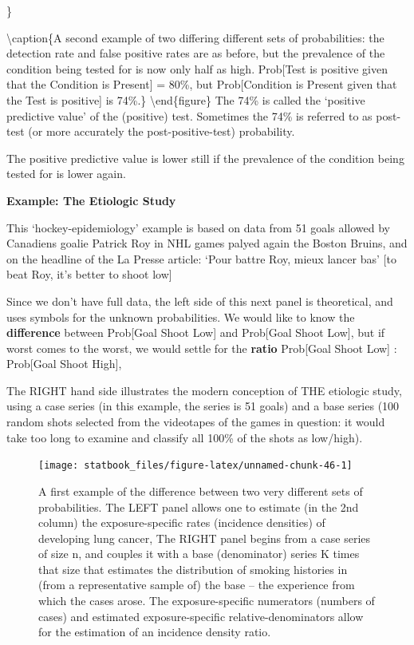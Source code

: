 \documentclass[]{book}
\begin{document}
\}

\textbackslash{}caption\{A second example of two differing different sets of probabilities: the detection rate and false positive rates are as before, but the prevalence of the condition being tested for is now only half as high. Prob{[}Test is positive given that the Condition is Present{]} = 80\%, but Prob{[}Condition is Present given that the Test is positive{]} is 74\%.\}\label{fig:unnamed-chunk-45}
\textbackslash{}end\{figure\}
The 74\% is called the `positive predictive value' of the (positive) test. Sometimes the 74\% is referred to as post-test (or more accurately the post-positive-test) probability.

The positive predictive value is lower still if the
prevalence of the condition being tested for is lower again.

\textbf{Example: The Etiologic Study}

This `hockey-epidemiology' example is based on data from 51 goals allowed by Canadiens goalie Patrick Roy in NHL games palyed again the Boston Bruins, and on the headline of the La Presse article: `Pour battre Roy, mieux lancer bas' {[}to beat Roy, it's better to shoot low{]}

Since we don't have full data, the left side of this next panel is theoretical, and uses symbols for the unknown probabilities. We would like to know the \textbf{difference} between Prob{[}Goal \textbar{} Shoot Low{]} and Prob{[}Goal \textbar{} Shoot Low{]}, but if worst comes to the worst, we would settle for the \textbf{ratio} Prob{[}Goal \textbar{} Shoot Low{]} : Prob{[}Goal \textbar{} Shoot High{]},

The RIGHT hand side illustrates the modern conception of THE etiologic study, using a case series (in this example, the series is 51 goals) and a base series (100 random shots selected from the videotapes of the games in question: it would take too long to examine and classify all 100\% of the shots as low/high).

\begin{figure}

{\centering \texttt{[image: statbook\_files/figure-latex/unnamed-chunk-46-1]} 

}

\caption{A first example of the difference between two very different sets of probabilities. The LEFT panel allows one to estimate (in the 2nd column) the exposure-specific rates (incidence densities) of developing lung cancer, The RIGHT panel begins from a case series of size n, and couples it with a base (denominator) series K times that size that estimates the distribution of smoking histories in (from a representative sample of) the base -- the experience from which the cases arose. The exposure-specific numerators (numbers of cases) and estimated exposure-specific relative-denominators allow for the estimation of an incidence density ratio.}\label{fig:unnamed-chunk-46}
\end{figure}
\end{document}
